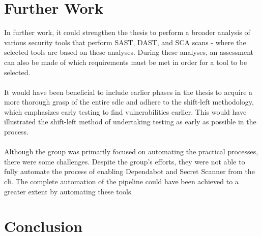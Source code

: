 



\section{Further Work}
In further work, it could strengthen the thesis to perform a broader analysis of various security tools that perform SAST, DAST, and SCA scans -  where the selected tools are based on these analyses. During these analyses, an assessment can also be made of which requirements must be met in order for a tool to be selected. 
\\~\\
It would have been beneficial to include earlier phases in the thesis to acquire a more thorough grasp of the entire \acrlong{sdlc} and adhere to the shift-left methodology, which emphasizes early testing to find vulnerabilities earlier.  This would have illustrated the shift-left method of undertaking testing as early as possible in the process.  
\\~\\
Although the group was primarily focused on automating the practical processes, there were some challenges. Despite the group's efforts, they were not able to fully automate the process of enabling Dependabot and Secret Scanner from the \acrshort{cli}. The complete automation of the pipeline could have been achieved to a greater extent by automating these tools. 

\section{Conclusion}
